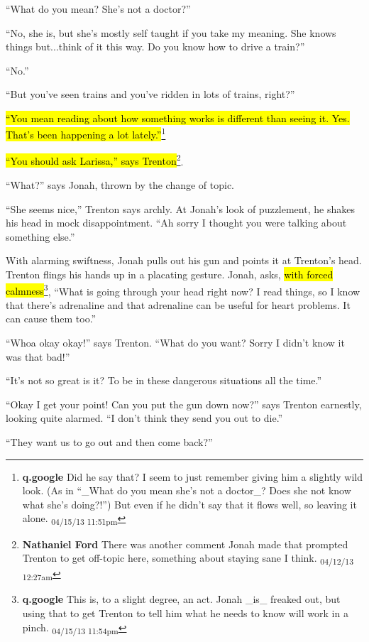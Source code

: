 ``What do you mean?  She's not a doctor?''

``No, she is, but she's mostly self taught if you take my meaning.  She knows things but...think of it this way.  Do you know how to drive a train?''

``No.''

``But you've seen trains and you've ridden in lots of trains, right?''

\hl{``You mean reading about how something works is different than seeing it.  Yes.  That's been happening a lot lately.''}\footnote{\textbf{q.google }Did he say that?  I seem to just remember giving him a slightly wild look.  (As in ``\_What do you mean she's not a doctor\_?  Does she not know what she's doing?!'')   But even if he didn't say that it flows well, so leaving it alone. \textsubscript{04/15/13 11:51pm}}

\hl{``You should ask Larissa,'' says Trenton}\footnote{\textbf{Nathaniel Ford }There was another comment Jonah made that prompted Trenton to get off-topic here, something about staying sane I think. \textsubscript{04/12/13 12:27am}}.

``What?'' says Jonah, thrown by the change of topic.

``She seems nice,'' Trenton says archly.  At Jonah's look of puzzlement, he shakes his head in mock disappointment.  ``Ah sorry I thought you were talking about something else.''



With alarming swiftness, Jonah pulls out his gun and points it at Trenton's head.  Trenton flings his hands up in a placating gesture.  Jonah, asks, \hl{with forced calmness}\footnote{\textbf{q.google }This is, to a slight degree, an act.  Jonah \_is\_ freaked out, but using that to get Trenton to tell him what he needs to know will work in a pinch. \textsubscript{04/15/13 11:54pm}}, ``What is going through your head right now?  I read things, so I know that there's adrenaline and that adrenaline can be useful for heart problems.  It can cause them too.''

``Whoa okay okay!'' says Trenton. ``What do you want?  Sorry I didn't know it was that bad!''

``It's not so great is it?  To be in these dangerous situations all the time.''

``Okay I get your point!  Can you put the gun down now?'' says Trenton earnestly, looking quite alarmed.  ``I don't think they send you out to die.''

``They want us to go out and then come back?''

